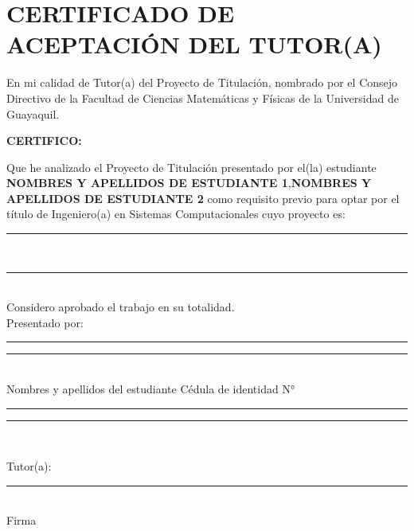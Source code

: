 \documentclass[12pt, a4paper, nofontenc, numbers=endperiod]{apa7}
\begin{document}
		\newpage
		{ %
			\section*{\large \centering CERTIFICADO DE ACEPTACIÓN DEL TUTOR(A)}
			\vspace*{3cm}
			\justify
			En mi calidad de Tutor(a) del Proyecto de Titulación, nombrado por el Consejo Directivo de la Facultad de Ciencias Matemáticas y Físicas de la Universidad de Guayaquil.
			
			\justify
			\textbf{CERTIFICO:} 
			
			{\setlength{\parindent}{1.27cm} Que he analizado el Proyecto de Titulación presentado por el(la) estudiante \textbf{NOMBRES Y APELLIDOS DE ESTUDIANTE 1},{\color{red}\textbf{NOMBRES Y APELLIDOS DE ESTUDIANTE 2}} como requisito previo para optar por el título de Ingeniero(a) en Sistemas Computacionales cuyo proyecto es:}\\
			\rule[0mm]{160mm}{0.1mm}\\[0.2cm]
			\rule[0mm]{160mm}{0.1mm}\\
			Considero aprobado el trabajo en su totalidad.\\
			Presentado por: \\
			
			\vspace*{-1.5cm}
			\begin{center}
				\vspace*{0.2cm}
				\singlespacing\rule[0mm]{68mm}{0.1mm} \hspace*{1.8cm} \rule[0mm]{58mm}{0.1mm}\\
				\hspace*{-0.1cm}Nombres y apellidos del estudiante
				\hspace*{3.4cm} Cédula de identidad N°
				
				\vspace*{0.5cm}
				{\color{red}\rule[0mm]{68mm}{0.1mm}} \hspace*{1.8cm} {\color{red}\rule[0mm]{58mm}{0.1mm}}\\
			\end{center}
			\vspace*{1cm}
			\begin{flushright}
				\begin{minipage}[b]{8cm}
					\singlespacing
					Tutor(a): \rule[0mm]{52mm}{0.1mm}\\ [0.3cm]
					\hspace*{3.5cm} Firma
				\end{minipage}
				

\end{flushright}}
\end{document}
